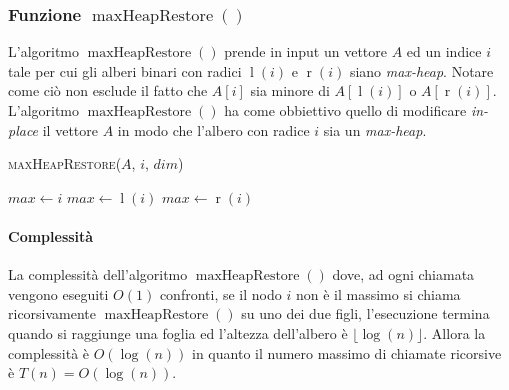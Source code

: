         \subsubsection{Funzione $\operatorname{maxHeapRestore}()$}
            L'algoritmo $\operatorname{maxHeapRestore}()$ prende in input un vettore $A$ ed un indice $i$ tale per cui gli alberi binari con radici $\operatorname{l}(i)$ e $\operatorname{r}(i)$ siano \textit{max-heap}. Notare come ciò non esclude il fatto che $A[i]$ sia minore di $A[\operatorname{l}(i)]$ o $A[\operatorname{r}(i)]$. L'algoritmo $\operatorname{maxHeapRestore}()$ ha come obbiettivo quello di modificare \textit{in-place} il vettore $A$ in modo che l'albero con radice $i$ sia un \textit{max-heap}.
            
            \begin{algorithm}
                \caption{\textsc{maxHeapRestore}(\Item[] $A$, \Int $i$, \Int $dim$)}
                \begin{algorithmic}
                    \State \Int $max \gets i$
                        \State \Int $max \gets \operatorname{l}(i)$
                    \EndIf
                        \State \Int $max \gets \operatorname{r}(i)$
                    \EndIf
                        \State {}
                        \State {}
                    \EndIf
                \end{algorithmic}
            \end{algorithm}
            \paragraph{Complessità}
                La complessità dell'algoritmo $\operatorname{maxHeapRestore}()$ dove, ad ogni chiamata vengono eseguiti $O(1)$ confronti, se il nodo $i$ non è il massimo si chiama ricorsivamente $\operatorname{maxHeapRestore}()$ su uno dei due figli, l'esecuzione termina quando si raggiunge una foglia ed l'altezza dell'albero è $\lfloor\log(n)\rfloor$. Allora la complessità è $O(\log(n))$ in quanto il numero massimo di chiamate ricorsive è $T(n)=O(\log(n))$.
